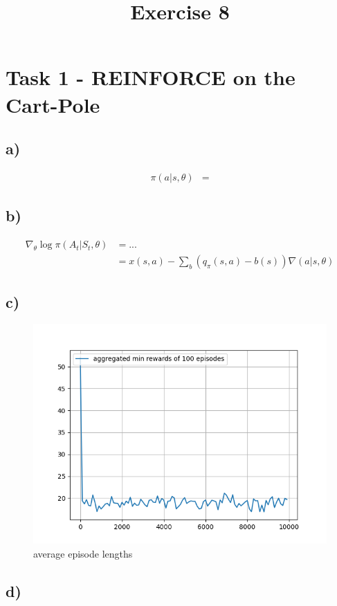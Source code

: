 \documentclass[a4paper]{article}
\date{}
\author{}
\title{\textbf{Exercise 8}}
\begin{document}
\maketitle 
\thispagestyle{fancy}

\section*{Task 1 - REINFORCE on the Cart-Pole}

\subsection*{a)}
\begin{align*}
\pi(a|s, \theta) &=
\end{align*}
\subsection*{b)}
\begin{align*}
	\nabla_{\theta} \log \pi (A_t | S_t, \theta) &= ... \\
	 &= x(s, a) - \sum_{b}^{}(q_{\pi}(s, a) - b(s)) \nabla(a|s, \theta)
\end{align*}

\subsection*{c)}
\begin{figure}[!ht]
	\centering
	\includegraphics[width=0.7\linewidth]{length}
	\caption{average episode lengths}
	\label{fig:length}
\end{figure}

\subsection*{d)}
\end{document}
